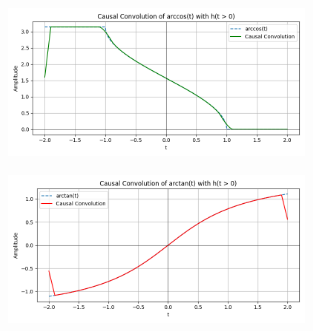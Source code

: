\documentclass[12pt]{article}
\begin{document}
\begin{figure}[H]
    \centering
    \includegraphics[width=0.7\textwidth]{figs/mod2.png}
\end{figure}
\begin{figure}[H]
    \centering
    \includegraphics[width=0.7\textwidth]{figs/mod3.png}
\end{figure}
\end{document}
